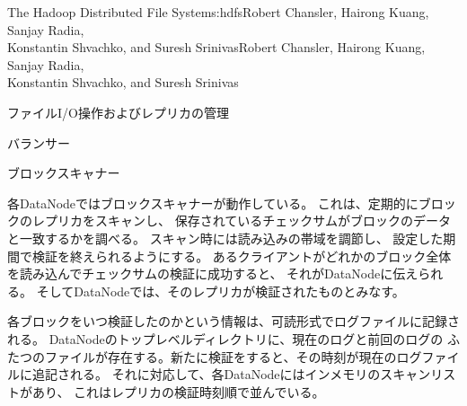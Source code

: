 \begin{aosachaptertoc}{The Hadoop Distributed File System}{s:hdfs}{Robert Chansler, Hairong Kuang, Sanjay Radia, \\ Konstantin Shvachko, and Suresh Srinivas}{Robert Chansler, Hairong Kuang, Sanjay Radia, \\ \hspace*{0.9cm} Konstantin Shvachko, and Suresh Srinivas}
\begin{aosasect1}{ファイルI/O操作およびレプリカの管理}
\begin{aosasect2}{バランサー}
\end{aosasect2}

\begin{aosasect2}{ブロックスキャナー}

各DataNodeではブロックスキャナーが動作している。
これは、定期的にブロックのレプリカをスキャンし、
保存されているチェックサムがブロックのデータと一致するかを調べる。
スキャン時には読み込みの帯域を調節し、
設定した期間で検証を終えられるようにする。
あるクライアントがどれかのブロック全体を読み込んでチェックサムの検証に成功すると、
それがDataNodeに伝えられる。
そしてDataNodeでは、そのレプリカが検証されたものとみなす。

各ブロックをいつ検証したのかという情報は、可読形式でログファイルに記録される。
DataNodeのトップレベルディレクトリに、現在のログと前回のログの
ふたつのファイルが存在する。新たに検証をすると、その時刻が現在のログファイルに追記される。
それに対応して、各DataNodeにはインメモリのスキャンリストがあり、
これはレプリカの検証時刻順で並んでいる。


\end{aosasect2}
\end{aosasect1}
\end{aosachaptertoc}
